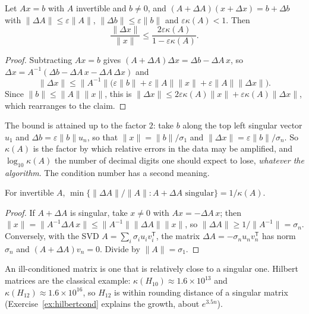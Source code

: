 \begin{theorem}\label{thm:perturb}
Let $Ax=b$ with $A$ invertible and $b\ne0$, and $(A+\Delta A)(x+\Delta x)=b+\Delta b$ with $\|\Delta A\|\le\varepsilon\|A\|$, $\|\Delta b\|\le\varepsilon\|b\|$
and $\varepsilon\kappa(A)<1$. Then
\[
\frac{\|\Delta x\|}{\|x\|}\le\frac{2\varepsilon\kappa(A)}{1-\varepsilon\kappa(A)}.
\]
\end{theorem}
\begin{proof}
Subtracting $Ax=b$ gives $(A+\Delta A)\Delta x=\Delta b-\Delta A\,x$, so $\Delta x=A^{-1}(\Delta b-\Delta A\,x-\Delta A\,\Delta x)$ and
\[
\|\Delta x\|\le\|A^{-1}\|\bigl(\varepsilon\|b\|+\varepsilon\|A\|\|x\|+\varepsilon\|A\|\|\Delta x\|\bigr).
\]
Since $\|b\|\le\|A\|\|x\|$, this is $\|\Delta x\|\le2\varepsilon\kappa(A)\|x\|+\varepsilon\kappa(A)\|\Delta x\|$, which rearranges to the claim.
\end{proof}

The bound is attained up to the factor $2$: take $b$ along the top left singular vector $u_1$ and $\Delta b=\varepsilon\|b\|u_n$, so that
$\|x\|=\|b\|/\sigma_1$ and $\|\Delta x\|=\varepsilon\|b\|/\sigma_n$. So $\kappa(A)$ is the factor by which relative errors in the data may be amplified, and
$\log_{10}\kappa(A)$ the number of decimal digits one should expect to lose, \emph{whatever the algorithm}. The condition number has a second meaning.

\begin{theorem}\label{thm:distsing}
For invertible $A$, $\min\{\|\Delta A\|/\|A\|:A+\Delta A\text{ singular}\}=1/\kappa(A)$.
\end{theorem}
\begin{proof}
If $A+\Delta A$ is singular, take $x\ne0$ with $Ax=-\Delta A\,x$; then $\|x\|=\|A^{-1}\Delta A\,x\|\le\|A^{-1}\|\|\Delta A\|\|x\|$, so
$\|\Delta A\|\ge1/\|A^{-1}\|=\sigma_n$. Conversely, with the SVD $A=\sum_i\sigma_iu_iv_i^{\mathsf T}$, the matrix $\Delta A=-\sigma_nu_nv_n^{\mathsf T}$ has norm
$\sigma_n$ and $(A+\Delta A)v_n=0$. Divide by $\|A\|=\sigma_1$.
\end{proof}

An ill-conditioned matrix is one that is relatively close to a singular one. Hilbert matrices are the classical example: $\kappa(H_{10})\approx1.6\times10^{13}$
and $\kappa(H_{12})\approx1.6\times10^{16}$, so $H_{12}$ is within rounding distance of a singular matrix (Exercise~\ref{ex:hilbertcond} explains the
growth, about $e^{3.5n}$).

